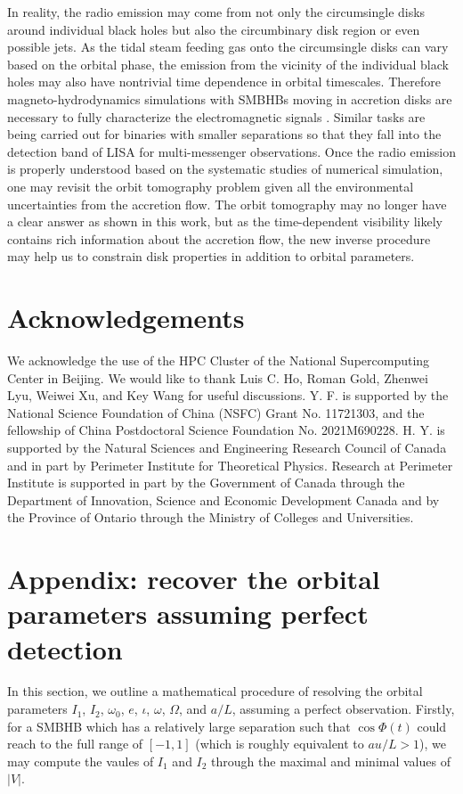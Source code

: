 \documentclass[twocolumn]{aastex62}
\def\[{\left[}
\def\]{\right]}
\begin{document}
In reality, the radio emission may come from not only the circumsingle disks around individual black holes but also the circumbinary disk region or even possible jets. As the tidal steam feeding gas onto the circumsingle disks can vary based on the orbital phase, the emission from the vicinity of the individual black holes may also have nontrivial time dependence in orbital timescales.
Therefore magneto-hydrodynamics simulations with SMBHBs moving in accretion disks are necessary to fully characterize the electromagnetic signals \citep[see, e.g., ][]{Gold:2013zma, Gold:2019nqg, Paschalidis:2021ntt}. Similar tasks are being carried out for binaries with smaller separations \citep[see, e.g., ][]{Farris:2012ux, Gold:2014dta} so that they fall into the detection band of LISA for multi-messenger observations. Once the radio emission is properly understood based on the systematic studies of numerical simulation, one may revisit the orbit tomography problem given all the environmental uncertainties from the accretion flow. The orbit tomography may no longer have a clear answer as shown in this work, but as the time-dependent visibility likely contains rich information about the accretion flow, the new inverse procedure may help us to constrain disk properties in addition to orbital parameters. 

\section*{Acknowledgements}
We acknowledge the use of the HPC Cluster of the National Supercomputing Center in Beijing. 
We would like to thank Luis C. Ho, Roman Gold, Zhenwei Lyu, Weiwei Xu, and Key Wang for useful discussions. 
Y. F. is supported by the National Science Foundation of China (NSFC) Grant No. 11721303, 
and the fellowship of China Postdoctoral Science Foundation No. 2021M690228. 
 H. Y. is supported by the Natural Sciences and
Engineering Research Council of Canada and in part by
Perimeter Institute for Theoretical Physics. Research at
Perimeter Institute is supported in part by the Government of
Canada through the Department of Innovation, Science and
Economic Development Canada and by the Province of Ontario through the Ministry of Colleges and Universities.


\section*{Appendix: recover the orbital parameters assuming perfect detection}\label{appendix}
%
In this section, we outline a mathematical procedure of resolving the orbital parameters $I_1$, $I_2$, $\omega_0$, $e$, $\iota$, $\omega$, $\Omega$, and $a/L$, assuming a perfect observation.  
Firstly, for a SMBHB which has a relatively large separation such that $\cos{\Phi(t)}$ could reach to the full range of $\[-1, 1\]$ (which is roughly equivalent to $a u/L>1$),  we may compute the vaules of $I_1$ and $I_2$ through the maximal and minimal values of $|V|$. 
\end{document}
